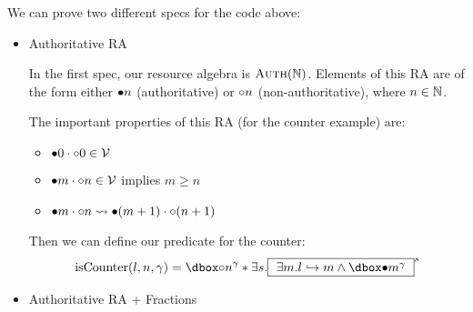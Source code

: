 We can prove two different specs for the code above:
\begin{itemize}
\item Authoritative RA

In the first spec, our resource algebra is $\textsc{Auth}(\mathbb{N})$. Elements of this RA are of the form either $\bullet n$ (authoritative) or $\circ n$ (non-authoritative), where $n \in \mathbb{N}$.

The important properties of this RA (for the counter example) are:
\begin{itemize}
\item $\bullet 0 \cdot \circ 0 \in \mathcal{V}$
\item $\bullet m \cdot \circ n \in \mathcal{V}$ implies $m \ge n$
\item $\bullet m \cdot \circ n \rightsquigarrow \bullet (m + 1) \cdot \circ (n + 1)$
\end{itemize}

Then we can define our predicate for the counter:
\[ \isCounter{l}{n}{\gamma} = \ownr{\naelem{n}} {\gamma} * \exists s.\inv{ $\exists m. \pointsto{l}{m} \land \ownr{\aelem{m}}{\gamma} $ }{s} \]

\item Authoritative RA + Fractions
\end{itemize}